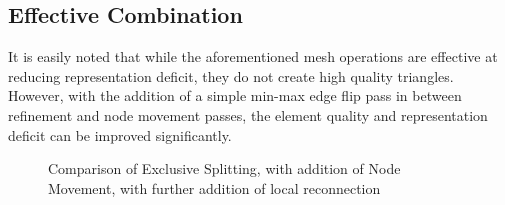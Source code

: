 \subsection{Effective Combination}
It is easily noted that while the aforementioned mesh operations are
effective at reducing representation deficit, they do not create high
quality triangles.  However, with the addition of a simple min-max edge
flip pass in between refinement and node movement passes, the element
quality and representation deficit can be improved significantly.

\begin{figure}[h!]
  \begin{center}
  \caption{Comparison of Exclusive Splitting, with addition of Node
Movement, with further addition of local reconnection}
  \label{fig_NodeSmoothing}
  \end{center}
\end{figure}

